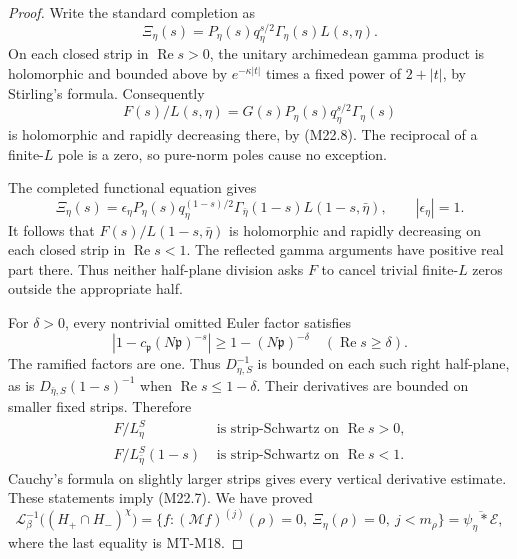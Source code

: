 \begin{proof}
Write the standard completion as
\[
 \Xi_\eta(s)=P_\eta(s)q_\eta^{s/2}
                  \Gamma_\eta(s)L(s,\eta).
\]
On each closed strip in \(\operatorname{Re}s>0\),
the unitary archimedean gamma product is
holomorphic and bounded above by
\(e^{-\kappa|t|}\) times a fixed power
of \(2+|t|\), by Stirling's formula.
Consequently
\[
        F(s)/L(s,\eta)
          =G(s)P_\eta(s)q_\eta^{s/2}\Gamma_\eta(s)
\]
is holomorphic and rapidly decreasing there,
by (M22.8).  The reciprocal of a finite-\(L\)
pole is a zero, so pure-norm poles cause
no exception.

The completed functional equation gives
\[
 \Xi_\eta(s)
   =\epsilon_\eta P_\eta(s)q_\eta^{(1-s)/2}
            \Gamma_{\bar\eta}(1-s)L(1-s,\bar\eta),
                    \qquad|\epsilon_\eta|=1.
\]
It follows that \(F(s)/L(1-s,\bar\eta)\)
is holomorphic and rapidly decreasing
on each closed strip in
\(\operatorname{Re}s<1\).
The reflected gamma arguments have positive
real part there.  Thus neither half-plane
division asks \(F\) to cancel trivial
finite-\(L\) zeros outside the appropriate half.

For \(\delta>0\), every nontrivial omitted
Euler factor satisfies
\[
 |1-c_{\mathfrak p}(N\mathfrak p)^{-s}|
                         \ge1-(N\mathfrak p)^{-\delta}
       \quad(\operatorname{Re}s\ge\delta).
\]
The ramified factors are one.
Thus \(D_{\eta,S}^{-1}\) is bounded on each
such right half-plane, as is
\(D_{\bar\eta,S}(1-s)^{-1}\) when
\(\operatorname{Re}s\le1-\delta\).
Their derivatives are bounded on smaller
fixed strips.  Therefore
\[
 \begin{split}
 F/L_\eta^S&\text{ is strip-Schwartz on }\operatorname{Re}s>0,\\
 F/L_{\bar\eta}^S(1-s)&\text{ is strip-Schwartz on }
                                      \operatorname{Re}s<1.
 \end{split}                                                    \tag{M22.9}
\]
Cauchy's formula on slightly larger strips
gives every vertical derivative estimate.
These statements imply (M22.7).
We have proved
\[
 \mathcal L_\beta^{-1}\bigl((H_+\cap H_-)^\chi\bigr)
   =\{f:(\mathcal Mf)^{(j)}(\rho)=0,\
          \Xi_\eta(\rho)=0,\ j<m_\rho\}
   =\overline{\psi_\eta*\mathcal E},                             \tag{M22.10}
\]
where the last equality is MT-M18.


\end{proof}
